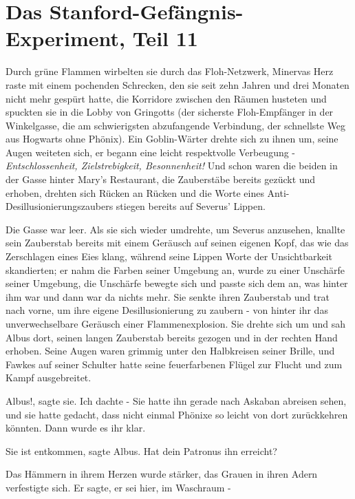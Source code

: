 \chapter{Das Stanford-Gefängnis-Experiment, Teil 11}

Durch grüne Flammen wirbelten sie durch das Floh-Netzwerk, Minervas Herz raste
mit einem pochenden Schrecken, den sie seit zehn Jahren und drei Monaten nicht
mehr gespürt hatte, die Korridore zwischen den Räumen husteten und spuckten sie
in die Lobby von Gringotts (der sicherste Floh-Empfänger in der Winkelgasse, die
am schwierigsten abzufangende Verbindung, der schnellste Weg aus Hogwarts ohne
Phönix). Ein Goblin-Wärter drehte sich zu ihnen um, seine Augen weiteten sich,
er begann eine leicht respektvolle Verbeugung - \emph{Entschlossenheit,
Zielstrebigkeit, Besonnenheit!} Und schon waren die beiden in der Gasse hinter
Mary's Restaurant, die Zauberstäbe bereits gezückt und erhoben, drehten sich
Rücken an Rücken und die Worte eines Anti-Desillusionierungszaubers stiegen
bereits auf Severus' Lippen.

Die Gasse war leer. Als sie sich wieder umdrehte, um Severus anzusehen, knallte
sein Zauberstab bereits mit einem Geräusch auf seinen eigenen Kopf, das wie das
Zerschlagen eines Eies klang, während seine Lippen Worte der Unsichtbarkeit
skandierten; er nahm die Farben seiner Umgebung an, wurde zu einer Unschärfe
seiner Umgebung, die Unschärfe bewegte sich und passte sich dem an, was hinter
ihm war und dann war da nichts mehr. Sie senkte ihren Zauberstab und trat nach
vorne, um ihre eigene Desillusionierung zu zaubern - von hinter ihr das
unverwechselbare Geräusch einer Flammenexplosion. Sie drehte sich um und sah
Albus dort, seinen langen Zauberstab bereits gezogen und in der rechten Hand
erhoben. Seine Augen waren grimmig unter den Halbkreisen seiner Brille, und
Fawkes auf seiner Schulter hatte seine feuerfarbenen Flügel zur Flucht und zum
Kampf ausgebreitet.

\glqq{}Albus!\grqq{}, sagte sie. \glqq{}Ich dachte -\grqq{} Sie hatte ihn gerade
nach Askaban abreisen sehen, und sie hatte gedacht, dass nicht einmal Phönixe so
leicht von dort zurückkehren könnten. Dann wurde es ihr klar.

\glqq{}Sie ist entkommen\grqq{}, sagte Albus. \glqq{}Hat dein Patronus ihn
erreicht?\grqq{}

Das Hämmern in ihrem Herzen wurde stärker, das Grauen in ihren Adern verfestigte
sich. \glqq{}Er sagte, er sei hier, im Waschraum -\grqq{}

